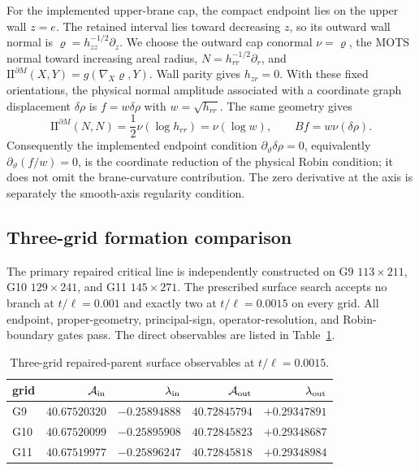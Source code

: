 \documentclass[11pt]{article}
\newcommand{\II}{\mathrm{II}}
\begin{document}
For the implemented upper-brane cap, the compact endpoint lies on the upper wall
$z=e$.  The retained interval lies toward decreasing $z$, so its outward wall
normal is $\varrho=h_{zz}^{-1/2}\partial_z$.  We choose the outward cap
conormal $\nu=\varrho$, the MOTS normal toward increasing areal radius,
$N=h_{rr}^{-1/2}\partial_r$, and
$\II^{\partial M}(X,Y)=g(\nabla_X\varrho,Y)$.  Wall parity gives
$h_{zr}=0$.  With these fixed orientations, the physical
normal amplitude associated with a coordinate graph displacement
$\delta\rho$ is $f=w\delta\rho$ with $w=\sqrt{h_{rr}}$.  The same geometry
gives
\begin{equation}
\II^{\partial M}(N,N)=\frac12\nu(\log h_{rr})=\nu(\log w),
\qquad Bf=w\nu(\delta\rho).
\end{equation}
Consequently the implemented endpoint condition
$\partial_\vartheta\delta\rho=0$, equivalently
$\partial_\vartheta(f/w)=0$, is the coordinate reduction of the physical
Robin condition; it does not omit the brane-curvature contribution.  The
zero derivative at the axis is separately the smooth-axis regularity
condition.

\subsection{Three-grid formation comparison}

The primary repaired critical line is independently constructed on G9
$113\times211$, G10 $129\times241$, and G11 $145\times271$.  The prescribed
surface search accepts no branch at $t/\ell=0.001$ and exactly two at
$t/\ell=0.0015$ on every grid.  All endpoint, proper-geometry, principal-sign,
operator-resolution, and Robin-boundary gates pass.  The direct observables
are listed in Table~\ref{tab:supp-three-grid}.

\begin{table}[ht]
\centering
\caption{Three-grid repaired-parent surface observables at $t/\ell=0.0015$.}
\label{tab:supp-three-grid}
\begin{tabular}{@{}lrrrr@{}}
\toprule
grid & $\mathcal A_{\rm in}$ & $\lambda_{\rm in}$ & $\mathcal A_{\rm out}$ & $\lambda_{\rm out}$ \\
\midrule
G9  & $40.67520320$ & $-0.25894888$ & $40.72845794$ & $+0.29347891$ \\
G10 & $40.67520099$ & $-0.25895908$ & $40.72845823$ & $+0.29348687$ \\
G11 & $40.67519977$ & $-0.25896247$ & $40.72845818$ & $+0.29348984$ \\
\bottomrule
\end{tabular}
\end{table}
\end{document}
